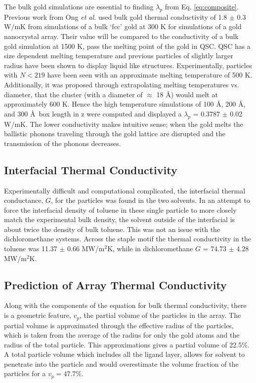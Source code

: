 The bulk gold simulations are essential to finding $\lambda_p$ from Eq. \ref{eq:composite}. Previous work from Ong \textit{et al.}\cite{Ong:2014yq} used bulk gold thermal conductivity of 1.8 $\pm$ 0.3 W/mK from simulations of a bulk `fcc' gold at 300 K for simulations of a gold nanocrystal array.
Their value will be compared to the conductivity of a bulk gold simulation at 1500 K, pass the melting point of the gold in QSC.
QSC has a size dependent melting temperature and previous particles of slightly larger radius have been shown to display liquid like structures.\cite{Stocker2016}
Experimentally, particles with $N<219$ have been seen with an approximate melting temperature of 500 K.\cite{Ercolessi1991}
Additionally, it was proposed through extrapolating melting temperatures vs. diameter, that the  cluster (with a diameter of $\approx$ 18 \AA) would melt at approximately 600 K.\cite{Buffat1976}
Hence the high temperature simulations of 100 \AA, 200 \AA, and 300 \AA\ box length in z were computed and displayed a $\lambda_p$ = 0.3787 $\pm$ 0.02 W/mK.
The lower conductivity makes intuitive sense; when the gold melts the ballistic phonons traveling through the gold lattice are disrupted and the transmission of the phonons decreases.

\subsection{Interfacial Thermal Conductivity}
Experimentally difficult and computational complicated, the interfacial thermal conductance, $G$, for the particles was found in the two solvents.
In an attempt to force the interfacial density of toluene in these single particle to more closely match the experimental bulk density, the solvent outside of the interfacial is about twice the density of bulk toluene.
This was not an issue with the dichloromethane systems. 
Across the staple motif the thermal conductivity in the toluene was 11.37 $\pm$ 0.66 MW/m$^2$K, while in dichloromethane $G$ = 74.73 $\pm$ 4.28 MW/m$^2$K.

\subsection{Prediction of Array Thermal Conductivity}
Along with the components of the equation for bulk thermal conductivity, there is a geometric feature, $v_p$, the partial volume of the  particles in the array.
The partial volume is approximated through the effective radius of the particles, which is taken from the average of the radius for only the gold atoms and the radius of the total particle.
This approximations gives a partial volume of 22.5\%.
A total particle volume which includes all the ligand layer, allows for solvent to penetrate into the particle and would overestimate the volume fraction of the particles for a $v_p = 47.7\%$.

